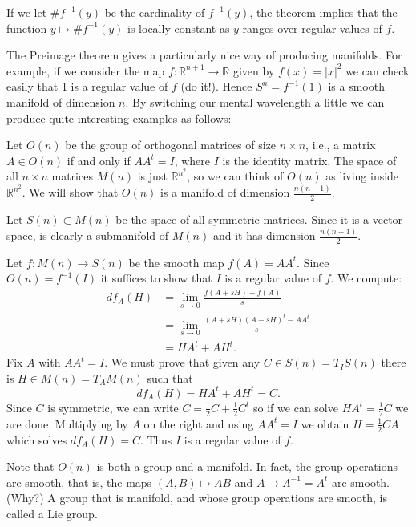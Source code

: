 \documentclass[a4paper, 10pt, twocolumn]{amsart}
\begin{document}
If we let $\# f^{-1}(y)$ be the cardinality of $f^{-1}(y)$, the theorem implies that the function $y \mapsto \# f^{-1}(y)$ is locally constant as $y$ ranges over regular values of $f$.

The Preimage theorem gives a particularly nice way of producing manifolds. For example, if we consider the map $f: \mathbb{R}^{n+1} \rightarrow \mathbb{R}$ given by $f(x)=|x|^{2}$ we can check easily that 1 is a regular value of $f$ (do it!). Hence $S^{n}=f^{-1}(1)$ is a smooth manifold of dimension $n$. By switching our mental wavelength a little we can produce quite interesting examples as follows:

\begin{example}
    Let $O(n)$ be the group of orthogonal matrices of size $n \times n$, i.e., a matrix $A \in O(n)$ if and only if $A A^{t}=I$, where $I$ is the identity matrix. The space of all $n \times n$
matrices $M(n)$ is just $\mathbb{R}^{n^{2}}$, so we can think of $O(n)$ as living inside $\mathbb{R}^{n^{2}}$. We will show that $O(n)$ is a manifold of dimension $\frac{n(n-1)}{2}$.

Let $S(n) \subset M(n)$ be the space of all symmetric matrices. Since it is a vector space, is clearly a submanifold of $M(n)$ and it has dimension $\frac{n(n+1)}{2}$.

Let $f: M(n) \rightarrow S(n)$ be the smooth map $f(A)=A A^{t}$. Since $O(n)=f^{-1}(I)$ it suffices to show that $I$ is a regular value of $f$. We compute:
$$
\begin{aligned}
d f_{A}(H) & =\lim _{s \rightarrow 0} \frac{f(A+s H)-f(A)}{s} \\
& =\lim _{s \rightarrow 0} \frac{(A+s H)(A+s H)^{t}-A A^{t}}{s} \\
& =H A^{t}+A H^{t}.
\end{aligned}
$$
Fix $A$ with $A A^{t}=I$. We must prove that given any $C \in S(n)=T_{I} S(n)$ there is $H \in M(n)=T_{A} M(n)$ such that
$$
d f_{A}(H)=H A^{t}+A H^{t}=C.
$$
Since $C$ is symmetric, we can write $C=\frac{1}{2} C+\frac{1}{2} C^{t}$ so if we can solve $H A^{t}=\frac{1}{2} C$ we are done. Multiplying by $A$ on the right and using $A A^{t}=I$ we obtain $H=\frac{1}{2} C A$ which solves $d f_{A}(H)=C$. Thus $I$ is a regular value of $f$.

Note that $O(n)$ is both a group and a manifold. In fact, the group operations are smooth, that is, the maps $(A, B) \mapsto A B$ and $A \mapsto A^{-1}=A^{t}$ are smooth. (Why?) A group that is manifold, and whose group operations are smooth, is called a Lie group.
\end{example}
\end{document}
